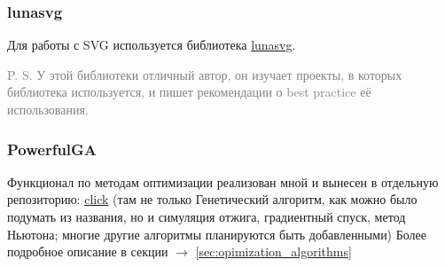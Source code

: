 \subsubsection{lunasvg}
Для работы с SVG используется библиотека \href{https://github.com/sammycage/lunasvg}{lunasvg}.

\textcolor{gray}{P. S. У этой библиотеки отличный автор, он изучает проекты, в которых библиотека используется, и пишет рекомендации о best practice её использования.}

\subsubsection{PowerfulGA}
Функционал по методам оптимизации реализован мной и вынесен в отдельную репозиторию: \href{https://github.com/donRumata03/PowerfulGA}{click}
(там не только Генетический алгоритм, как можно было подумать из названия, но и симуляция отжига, градиентный спуск, метод Ньютона;
многие другие алгоритмы планируются быть добавленными)
Более подробное описание в секции $\longrightarrow$ \ref{sec:opimization_algorithms}